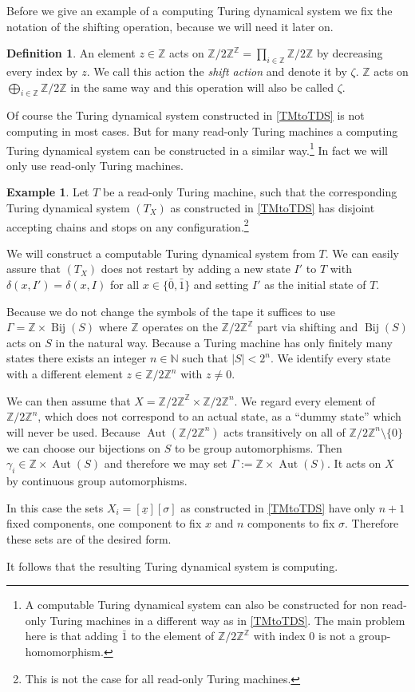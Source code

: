 \documentclass[12pt,a4paper]{scrartcl}
\theoremstyle{plain}
\theoremstyle{definition}
\newtheorem{Definition}[Theorem]{Definition}
\newtheorem{Example}[Theorem]{Example}
\numberwithin{equation}{section}
\newcommand{\Z}{\mathbb{Z}} %
\newcommand{\N}{\mathbb{N}} %
\newcommand{\2}{\mathbb{Z} / 2 \mathbb{Z}}
\newcommand{\1}{\bar{1}}
\newcommand{\0}{\bar{0}}
\newcommand{\Aut}{\operatorname{Aut}}
\newcommand{\Bij}{\operatorname{Bij}}
\begin{document}
Before we give an example of a computing Turing dynamical system we fix the notation of the shifting operation, because we will need it later on.
\begin{Definition} \label{shift}
	An element $z \in \Z$ acts on $\2^{\Z} = \prod_{i \in \Z} \2$ by decreasing every index by $z$. We call this action the \emph{shift action} and denote it by $\zeta$. $\Z$ acts on $\bigoplus_{i \in \Z} \2$ in the same way and this operation will also be called $\zeta$.
\end{Definition}
Of course the Turing dynamical system constructed in \ref{TMtoTDS} is not computing in most cases. But for many read-only Turing machines a computing Turing dynamical system can be constructed in a similar way.\footnote{A computable Turing dynamical system can also be constructed for non read-only Turing machines in a different way as in \ref{TMtoTDS}. The main problem here is that adding $\1$ to the element of $\2^\Z$ with index $0$ is not a group-homomorphism.} In fact we will only use read-only Turing machines.
\begin{Example} \label{roTMtoTDS}
	Let $T$ be a read-only Turing machine, such that the corresponding Turing dynamical system $(T_X)$ as constructed in \ref{TMtoTDS} has disjoint accepting chains and stops on any configuration.\footnote{This is not the case for all read-only Turing machines.}
	
	We will construct a computable Turing dynamical system from $T$.  We can easily assure that $(T_X)$ does not restart by adding a new state $I'$ to $T$ with $\delta(x, I') = \delta(x, I)$ for all $x \in \{ \0, \1 \}$ and setting $I'$ as the initial state of $T$.
	
	Because we do not change the symbols of the tape it suffices to use $\Gamma = \Z \times \Bij(S)$ where $\Z$ operates on the $\2^\Z$ part via shifting and $\Bij(S)$ acts on $S$ in the natural way. Because a Turing machine has only finitely many states there exists an integer $n \in \N$ such that $|S| < 2^n$. We identify every state with a different element $z \in \2^n$ with $z \neq 0$.
	
	We can then assume that $X = \2^\Z \times \2^n$. We regard every element of $\2^n$, which does not correspond to an actual state, as a ``dummy state'' which will never be used. Because $\Aut(\2^n)$ acts transitively on all of $\2^n \setminus \{0\}$ we can choose our bijections on $S$ to be group automorphisms. Then $\gamma_i \in \Z \times \Aut(S)$ and therefore we may set $\Gamma := \Z \times \Aut(S)$. It acts on $X$ by continuous group automorphisms.
	
	In this case the sets $X_i = [\underline{x}][\sigma]$ as constructed in \ref{TMtoTDS} have only $n+1$ fixed components, one component to fix $x$ and $n$ components to fix $\sigma$. Therefore these sets are of the desired form.
	 
	It follows that the resulting Turing dynamical system is computing.
\end{Example}
\end{document}
